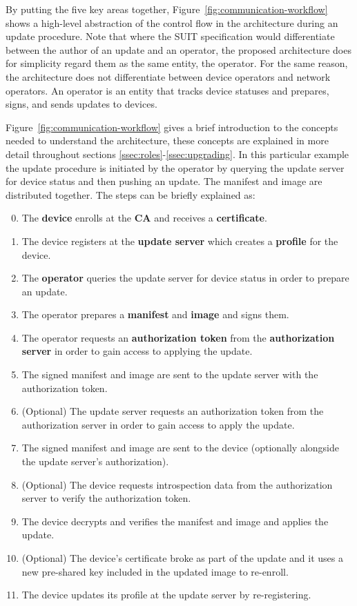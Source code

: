 \documentclass[0-thesis.tex]{subfiles}
\begin{document}
By putting the five key areas together, Figure~\ref{fig:communication-workflow} shows a
high-level abstraction of the control flow in the architecture during an update procedure.
Note that where the SUIT specification would differentiate between the author of an update
and an operator, the proposed architecture does for simplicity regard them as the same
entity, the operator. For the same reason, the architecture does not differentiate between
device operators and network operators. An operator is an entity that tracks device
statuses and prepares, signs, and sends updates to devices.

Figure~\ref{fig:communication-workflow} gives a brief introduction to the concepts needed
to understand the architecture, these concepts are explained in more detail throughout
sections \ref{ssec:roles}-\ref{ssec:upgrading}. In this particular example the update
procedure is initiated by the operator by querying the update server for device status and
then pushing an update. The manifest and image are distributed together. The steps can be
briefly explained as:

\begin{enumerate}
    \setcounter{enumi}{-1}
    \item The \textbf{device} enrolls at the \textbf{CA} and receives a
            \textbf{certificate}.
    \item The device registers at the \textbf{update server} which creates a \textbf{profile}
            for the device.
    \item The \textbf{operator} queries the update server for device status in order to
            prepare an update.
    \item The operator prepares a \textbf{manifest} and \textbf{image} and signs them.
    \item The operator requests an \textbf{authorization token} from the
            \textbf{authorization server} in order to gain access to applying the update.
    \item The signed manifest and image are sent to the update server with the
            authorization token.
    \item (Optional) The update server requests an authorization token from the
            authorization server in order to gain access to apply the update.
    \item The signed manifest and image are sent to the device (optionally alongside the
            update server's authorization).
    \item (Optional) The device requests introspection data from the authorization server
            to verify the authorization token.
    \item The device decrypts and verifies the manifest and image and applies the update.
    \item (Optional) The device's certificate broke as part of the update and it uses a
            new pre-shared key included in the updated image to re-enroll.
    \item The device updates its profile at the update server by re-registering.
\end{enumerate}
\end{document}
